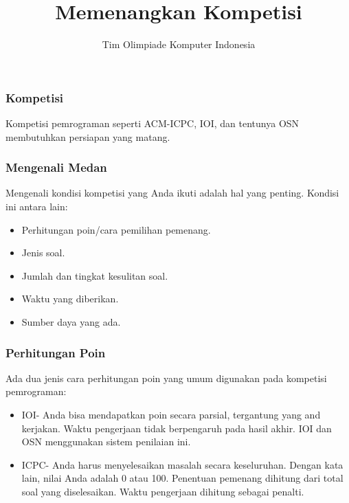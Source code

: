  

\title{Memenangkan Kompetisi}
\author{Tim Olimpiade Komputer Indonesia}
\date{}



\begin{frame}
  \titlepage
\end{frame}

  
\begin{frame}
  \frametitle{Kompetisi}
  Kompetisi pemrograman seperti ACM-ICPC, IOI, dan tentunya OSN membutuhkan persiapan yang matang.
\end{frame}

\begin{frame}
  \frametitle{Mengenali Medan}
  Mengenali kondisi kompetisi yang Anda ikuti adalah hal yang penting. Kondisi ini antara lain:
  \begin{itemize}
    \item Perhitungan poin/cara pemilihan pemenang.
    \item Jenis soal.
    \item Jumlah dan tingkat kesulitan soal.
    \item Waktu yang diberikan.
    \item Sumber daya yang ada.
  \end{itemize}
\end{frame}


\begin{frame}
  \frametitle{Perhitungan Poin}
  Ada dua jenis cara perhitungan poin yang umum digunakan pada kompetisi pemrograman:
  \begin{itemize}
    \item IOI-\newline
     Anda bisa mendapatkan poin secara parsial, tergantung  yang and kerjakan. Waktu pengerjaan tidak berpengaruh pada hasil akhir. IOI dan OSN menggunakan sistem penilaian ini.
    
    \item ICPC-\newline
    Anda harus menyelesaikan masalah secara keseluruhan. Dengan kata lain, nilai Anda adalah 0 atau 100. Penentuan pemenang dihitung dari total soal yang diselesaikan.  Waktu pengerjaan dihitung sebagai penalti.
  \end{itemize}
\end{frame}

